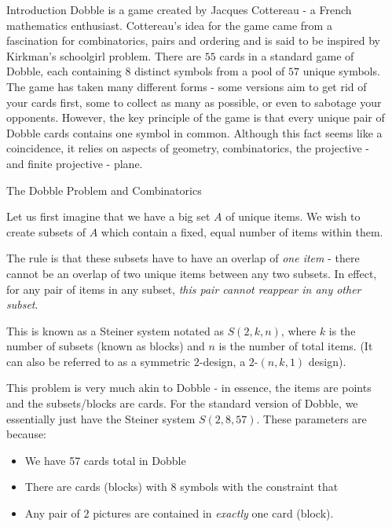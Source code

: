\documentclass[final]{beamer}
\newlength{\sepwidth}
\newlength{\colwidth}
\newcommand{\separatorcolumn}{\begin{column}{\sepwidth}\end{column}}
\begin{document}
\begin{frame}[t]
\begin{columns}[t]
\separatorcolumn

\begin{column}{\colwidth}

  \begin{block}{Introduction}
    Dobble is a game created by Jacques Cottereau - a French mathematics enthusiast. Cottereau’s idea for the game came from a fascination for combinatorics, pairs and ordering and is said to be inspired by Kirkman’s schoolgirl problem. There are $55$ cards in a standard game of Dobble, each containing $8$ distinct symbols from a pool of $57$ unique symbols. The game has taken many different forms - some versions aim to get rid of your cards first, some to collect as many as possible, or even to sabotage your opponents. However, the key principle of the game is that every unique pair of Dobble cards contains one symbol in common. Although this fact seems like a coincidence, it relies on aspects of geometry, combinatorics, the projective - and finite projective - plane. 
  \end{block}

  \begin{alertblock}{The Dobble Problem and Combinatorics}

    Let us first imagine that we have a big set $A$ of unique items. We wish to create subsets of $A$ which contain a fixed, equal number of items within them.
    
    The rule is that these subsets have to have an overlap of \emph{one item} - there cannot be an overlap of two unique items between any two subsets. In effect, for any pair of items in any subset, \emph{this pair cannot reappear in any other subset}.

    This is known as a Steiner system notated as $S(2,k,n)$, where $k$ is the number of subsets (known as blocks) and $n$ is the number of total items. (It can also be referred to as a symmetric $2$-design, a $2$-$(n,k,1)$ design).

This problem is very much akin to Dobble - in essence, the items are points and the subsets/blocks are cards. For the standard version of Dobble, we essentially just have the Steiner system $S(2,8,57)$.
These parameters are because:
\begin{itemize}
    \item We have 57 cards total in Dobble
    \item There are cards (blocks) with $8$ symbols with the constraint that
    \item Any pair of $2$ pictures are contained in \emph{exactly} one card (block).
\end{itemize}


\end{alertblock}
\end{column}
\end{columns}
\end{frame}
\end{document}

